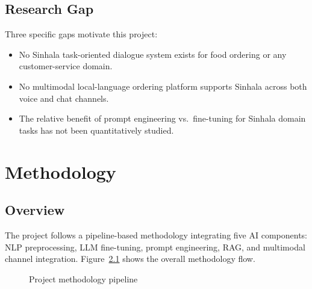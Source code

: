 \documentclass[12pt,a4paper]{report}
\begin{document}
\section{Research Gap}
Three specific gaps motivate this project:
\begin{itemize}
    \item No Sinhala task-oriented dialogue system exists for food ordering or any customer-service domain.
    \item No multimodal local-language ordering platform supports Sinhala across both voice and chat channels.
    \item The relative benefit of prompt engineering vs.\ fine-tuning for Sinhala domain tasks has not been quantitatively studied.
\end{itemize}

\chapter{Methodology}

\section{Overview}
The project follows a pipeline-based methodology integrating five AI components: NLP preprocessing, LLM fine-tuning, prompt engineering, RAG, and multimodal channel integration. Figure~\ref{fig:methodology} shows the overall methodology flow.

\begin{figure}[H]
\centering
{}
\caption{Project methodology pipeline}
\label{fig:methodology}
\end{figure}
\end{document}
